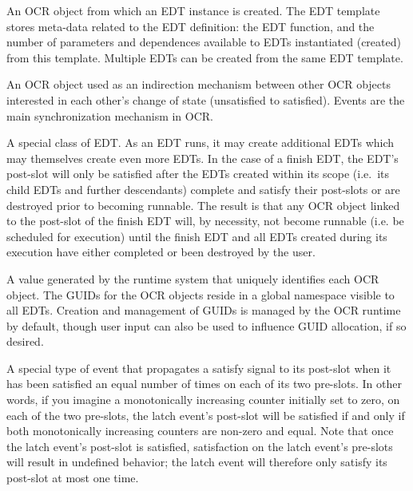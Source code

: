 \glossarydefstart
An OCR object from which an EDT instance is created. The EDT template
stores meta-data related to the EDT definition: the EDT function, and
the number of parameters and dependences available to EDTs
instantiated (created) from this template. Multiple EDTs can be created from the
same EDT template.
\glossarydefend

\glossarydefstart
An OCR object used as an indirection mechanism between other OCR
objects interested in each other's change of state (unsatisfied to
satisfied). Events are the main synchronization mechanism in OCR.
\glossarydefend

\glossarydefstart
A special class of EDT. As an EDT runs, it may create additional EDTs
which may themselves create even more EDTs.
In the case of a finish EDT, the EDT's post-slot will only be
satisfied after the EDTs created within its scope (i.e.\ its child EDTs and further
descendants) complete and satisfy their post-slots or are destroyed prior to
becoming runnable. The result is that
any OCR object linked to the post-slot of the finish EDT will, by
necessity, not become runnable (i.e. be scheduled for
execution) until the finish EDT and all EDTs created during its
execution have either completed or been destroyed by the user.
\glossarydefend

\glossarydefstart
A value generated by the runtime system that uniquely identifies each
OCR object. The GUIDs for the OCR objects reside in a global namespace
visible to all EDTs. Creation and management
of GUIDs is managed by the OCR runtime by default, though user input can also be
used to influence GUID allocation, if so desired.
\glossarydefend

\glossarydefstart
A special type of event that propagates a satisfy signal to its post-slot
when it has been satisfied an equal number of times on each of its two
pre-slots. In other words, if you imagine a monotonically increasing
counter initially set to zero, on each of the two pre-slots, the latch event's post-slot will
be satisfied if and only if both monotonically
increasing counters are non-zero and equal. Note that once the latch
event's post-slot is satisfied, satisfaction on the latch event's
pre-slots will result in undefined behavior; the latch event will
therefore only satisfy its post-slot at most one time.
\glossarydefend

